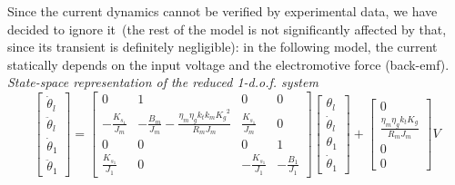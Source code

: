 Since the current dynamics cannot be verified by experimental data, we have decided to ignore it~(the rest of the model is not significantly affected by that, since its transient is definitely negligible): in the following model, the current statically depends on the input voltage and the electromotive force (back-emf).\\
\textit{State-space representation of the reduced 1-d.o.f. system}
\begin{equation}
	\begin{bmatrix}
		\dot{\theta}_l \\
		\ddot{\theta}_l \\
		\dot{\theta}_1 \\
		\ddot{\theta}_1
	\end{bmatrix}
	=
	\begin{bmatrix}
		0 &1 & 0 & 0 \\
		-\frac{K_{s_1}}{J_m} & -\frac{B_m}{J_m}-\frac{\eta_m \eta_g k_t k_m {K_g}^2}{R_m J_m}  & \frac{K_{s_1}}{J_m} & 0 \\
		0 & 0 & 0 & 1 \\
		\frac{K_{s_1}}{J_1} & 0 & -\frac{K_{s_1}}{J_1} & -\frac{B_1}{J_1}
	\end{bmatrix}
	\begin{bmatrix}
		\theta_l \\
		\dot{\theta}_l \\
		\theta_1 \\
		\dot{\theta}_1
	\end{bmatrix}
	+
	\begin{bmatrix}
		0 \\
		\frac{\eta_m \eta_g k_t K_g}{R_m J_m} \\
		0 \\
		0
	\end{bmatrix}
	V
\end{equation}


